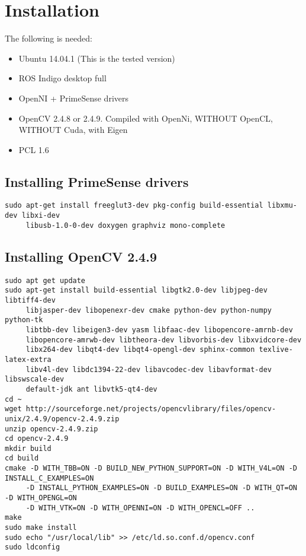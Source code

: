 \documentclass[letterpaper,10pt]{article}
\begin{document}
\section{Installation}

The following is needed:
\begin{itemize}
\item Ubuntu 14.04.1 (This is the tested version)
\item ROS Indigo desktop full
\item OpenNI + PrimeSense drivers
\item OpenCV 2.4.8 or 2.4.9. Compiled with OpenNi, WITHOUT OpenCL, WITHOUT Cuda, with Eigen
\item PCL 1.6
\end{itemize}

\subsection{Installing PrimeSense drivers}
\begin{verbatim}
sudo apt-get install freeglut3-dev pkg-config build-essential libxmu-dev libxi-dev 
     libusb-1.0-0-dev doxygen graphviz mono-complete

\end{verbatim}

\subsection{Installing OpenCV 2.4.9}
\begin{verbatim}
sudo apt get update
sudo apt-get install build-essential libgtk2.0-dev libjpeg-dev libtiff4-dev 
     libjasper-dev libopenexr-dev cmake python-dev python-numpy python-tk 
     libtbb-dev libeigen3-dev yasm libfaac-dev libopencore-amrnb-dev 
     libopencore-amrwb-dev libtheora-dev libvorbis-dev libxvidcore-dev 
     libx264-dev libqt4-dev libqt4-opengl-dev sphinx-common texlive-latex-extra 
     libv4l-dev libdc1394-22-dev libavcodec-dev libavformat-dev libswscale-dev 
     default-jdk ant libvtk5-qt4-dev
cd ~
wget http://sourceforge.net/projects/opencvlibrary/files/opencv-unix/2.4.9/opencv-2.4.9.zip
unzip opencv-2.4.9.zip
cd opencv-2.4.9
mkdir build
cd build
cmake -D WITH_TBB=ON -D BUILD_NEW_PYTHON_SUPPORT=ON -D WITH_V4L=ON -D INSTALL_C_EXAMPLES=ON 
     -D INSTALL_PYTHON_EXAMPLES=ON -D BUILD_EXAMPLES=ON -D WITH_QT=ON -D WITH_OPENGL=ON 
     -D WITH_VTK=ON -D WITH_OPENNI=ON -D WITH_OPENCL=OFF ..
make
sudo make install
sudo echo "/usr/local/lib" >> /etc/ld.so.conf.d/opencv.conf
sudo ldconfig
\end{verbatim}
\end{document}
